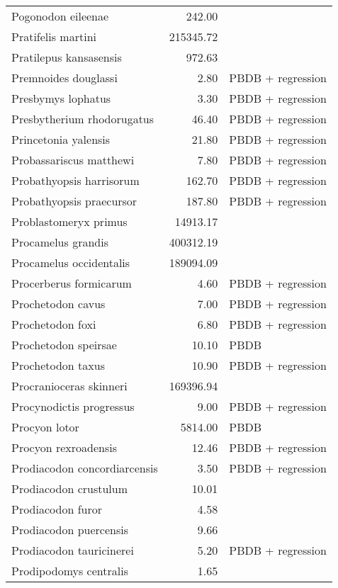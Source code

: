 \begin{table}[ht]
\begin{tabular}{lrl}
  Pogonodon eileenae & 242.00 & \cite{Fox2011b} \\ 
  Pratifelis martini & 215345.72 & \cite{Tomiya2013} \\ 
  Pratilepus kansasensis & 972.63 & \cite{Tomiya2013} \\ 
  Premnoides douglassi & 2.80 & PBDB + regression \\ 
  Presbymys lophatus & 3.30 & PBDB + regression \\ 
  Presbytherium rhodorugatus & 46.40 & PBDB + regression \\ 
  Princetonia yalensis & 21.80 & PBDB + regression \\ 
  Probassariscus matthewi & 7.80 & PBDB + regression \\ 
  Probathyopsis harrisorum & 162.70 & PBDB + regression \\ 
  Probathyopsis praecursor & 187.80 & PBDB + regression \\ 
  Problastomeryx primus & 14913.17 & \cite{Tomiya2013} \\ 
  Procamelus grandis & 400312.19 & \cite{Tomiya2013} \\ 
  Procamelus occidentalis & 189094.09 & \cite{Tomiya2013} \\ 
  Procerberus formicarum & 4.60 & PBDB + regression \\ 
  Prochetodon cavus & 7.00 & PBDB + regression \\ 
  Prochetodon foxi & 6.80 & PBDB + regression \\ 
  Prochetodon speirsae & 10.10 & PBDB \\ 
  Prochetodon taxus & 10.90 & PBDB + regression \\ 
  Procranioceras skinneri & 169396.94 & \cite{Tomiya2013} \\ 
  Procynodictis progressus & 9.00 & PBDB + regression \\ 
  Procyon lotor & 5814.00 & PBDB \\ 
  Procyon rexroadensis & 12.46 & PBDB + regression \\ 
  Prodiacodon concordiarcensis & 3.50 & PBDB + regression \\ 
  Prodiacodon crustulum & 10.01 & \cite{Lim2001} \\ 
  Prodiacodon furor & 4.58 & \cite{Scott1937} \\ 
  Prodiacodon puercensis & 9.66 & \cite{Mellett1969} \\ 
  Prodiacodon tauricinerei & 5.20 & PBDB + regression \\ 
  Prodipodomys centralis & 1.65 & \cite{Becker1981} \\ 

\end{tabular}
\end{table}

